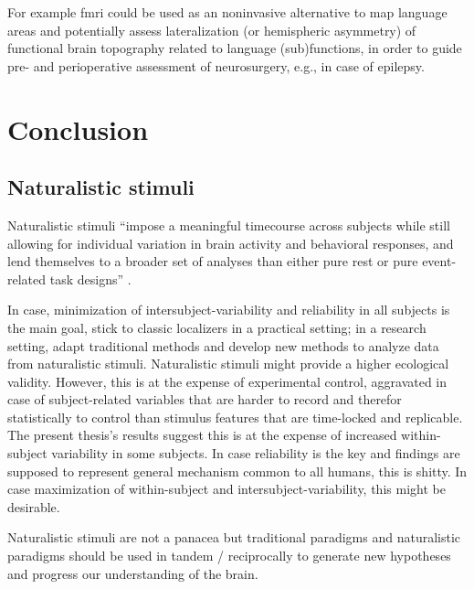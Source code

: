 
%
For example \ac{fmri} could be used as an noninvasive alternative to map
language areas and potentially assess lateralization (or hemispheric asymmetry)
of functional brain topography related to language (sub)functions, in order to
guide pre- and perioperative assessment of neurosurgery, e.g., in case of
epilepsy.



\section{Conclusion}


\subsection{Naturalistic stimuli}

%
Naturalistic stimuli ``impose a meaningful timecourse across subjects while
still allowing for individual variation in brain activity and behavioral
responses, and lend themselves to a broader set of analyses than either pure
rest or pure event-related task designs'' \citep[][p. 142]{finn2017can}.

%
In case, minimization of intersubject-variability and reliability in all
subjects is the main goal, stick to classic localizers in a practical setting;
in a research setting, adapt traditional methods and develop new methods to
analyze data from naturalistic stimuli.
%
Naturalistic stimuli might provide a higher ecological validity.
%
However, this is at the expense of experimental control, aggravated in case of
subject-related variables that are harder to record and therefor statistically
to control than stimulus features that are time-locked and replicable.
%
The present thesis's results suggest this is at the expense of increased
within-subject variability in some subjects.
%
In case reliability is the key and findings are supposed to represent general
mechanism common to all humans, this is shitty.
%
In case maximization of within-subject and intersubject-variability, this might
be desirable.

%
Naturalistic stimuli are not a panacea but traditional paradigms and
naturalistic paradigms should be used in tandem / reciprocally to generate new
hypotheses and progress our understanding of the brain.

